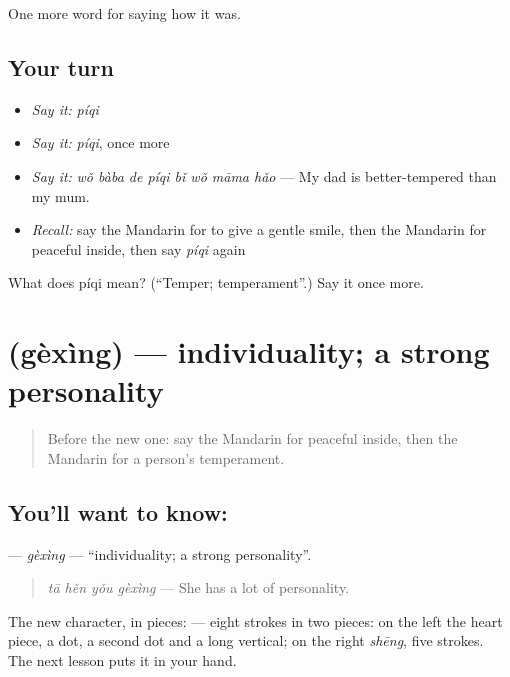 \begin{grammarlens}[title={What you've built}]
One more word for saying how it was.
\end{grammarlens}

\subsection*{Your turn}
\begin{itemize}
\raggedright
  \item \emph{Say it:} \emph{píqi}
  \item \emph{Say it:} \emph{píqi}, once more
  \item \emph{Say it:} \emph{wǒ bàba de píqi bǐ wǒ māma hǎo} — My dad is better-tempered than my mum.
  \item \emph{Recall:} say the Mandarin for to give a gentle smile, then the Mandarin for peaceful inside, then say \emph{píqi} again
\end{itemize}

\begin{tcolorbox}[breakable,colback=teal!4,colframe=teal!35!black,title={Before you move on}]
What does píqi mean? (\textquotedblleft{}Temper; temperament\textquotedblright{}.) Say it once more.
\end{tcolorbox}
\section[\texorpdfstring{\zh{个性} (gèxìng)}{个性 (gèxìng)}]{ (gèxìng) — individuality; a strong personality}

\label{lesson:ZH-C467-gexing}



\begin{quote}
Before the new one: say the Mandarin for peaceful inside, then the Mandarin for a person's temperament.
\end{quote}

\subsection*{You'll want to know: }
\textbf{} — \emph{gèxìng} — \textquotedblleft{}individuality; a strong personality\textquotedblright{}.

\begin{quote}
\emph{tā hěn yǒu gèxìng} — She has a lot of personality.
\end{quote}

The new character, in pieces:  — eight strokes in two pieces: on the left the heart piece, a dot, a second dot and a long vertical; on the right  \emph{shēng}, five strokes. The next lesson puts it in your hand.

